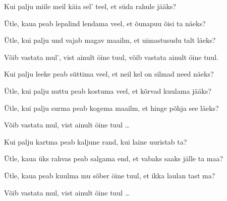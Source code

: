 Kui palju miile meil k\"aia sel' teel,
et s\"uda rahule j\"a\"aks?

\"Utle, kaua peab lepalind lendama veel,
et \~ounapuu \~oisi ta n\"aeks?

\"Utle, kui palju und vajab magav maailm,
et uimastusudu talt l\"aeks?

V\~oib vastata mul', vist ainult \"oine tuul,
v\~oib vastata ainult \"oine tuul.

Kui palju leeke peab s\"uttima veel,
et neil kel on silmad need n\"aeks?

\"Utle, kui palju nuttu peab kostuma veel,
et k\~orvad kuulama j\"a\"aks?

\"Utle, kui palju surma peab kogema maailm,
et hinge p\~ohja see l\"aeks?

V\~oib vastata mul, vist ainult \"oine tuul \ldots

Kui palju kartma peab kaljune rand,
kui laine uuristab ta?

\"Utle, kaua \"uks rahvas peab salgama end,
et vabaks saaks j\"alle ta maa?

\"Utle, kaua peab kuulma mu s\~ober \"oine tuul,
et ikka laulan tast ma?

V\~oib vastata mul, vist ainult \"oine tuul \ldots